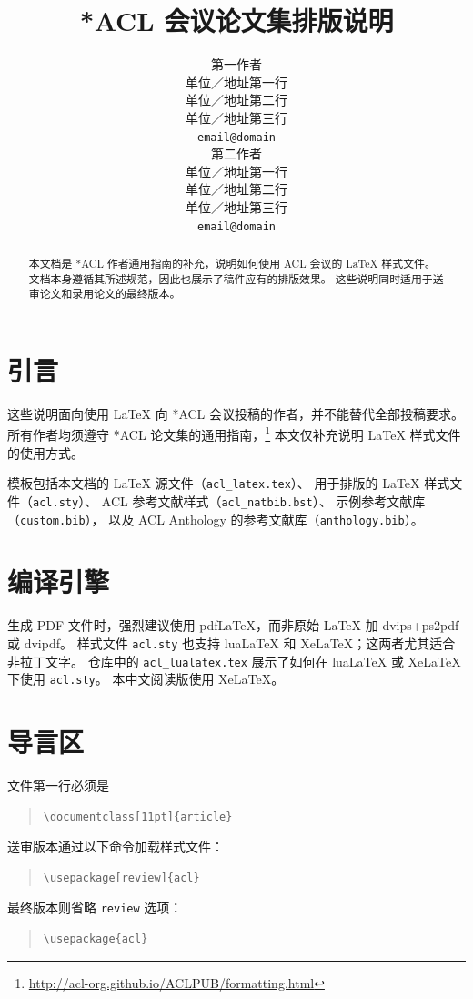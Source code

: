 \documentclass[11pt]{article}
\title{*ACL 会议论文集排版说明}
\author{第一作者 \\
  单位／地址第一行 \\
  单位／地址第二行 \\
  单位／地址第三行 \\
  \texttt{email@domain} \\\And
  第二作者 \\
  单位／地址第一行 \\
  单位／地址第二行 \\
  单位／地址第三行 \\
  \texttt{email@domain} \\}
\begin{document}
\maketitle
\begin{abstract}
本文档是 *ACL 作者通用指南的补充，说明如何使用 ACL 会议的 \LaTeX{} 样式文件。
文档本身遵循其所述规范，因此也展示了稿件应有的排版效果。
这些说明同时适用于送审论文和录用论文的最终版本。
\end{abstract}

\section{引言}

这些说明面向使用 \LaTeX{} 向 *ACL 会议投稿的作者，并不能替代全部投稿要求。所有作者均须遵守 *ACL 论文集的通用指南，\footnote{\url{http://acl-org.github.io/ACLPUB/formatting.html}} 本文仅补充说明 \LaTeX{} 样式文件的使用方式。

模板包括本文档的 \LaTeX{} 源文件（\texttt{acl\_latex.tex}）、
用于排版的 \LaTeX{} 样式文件（\texttt{acl.sty}）、
ACL 参考文献样式（\texttt{acl\_natbib.bst}）、
示例参考文献库（\texttt{custom.bib}），
以及 ACL Anthology 的参考文献库（\texttt{anthology.bib}）。

\section{编译引擎}

生成 PDF 文件时，强烈建议使用 pdf\LaTeX{}，而非原始 \LaTeX{} 加 dvips+ps2pdf 或 dvipdf。
样式文件 \texttt{acl.sty} 也支持 lua\LaTeX{} 和 Xe\LaTeX{}；这两者尤其适合非拉丁文字。
仓库中的 \texttt{acl\_lualatex.tex} 展示了如何在 lua\LaTeX{} 或 Xe\LaTeX{} 下使用 \texttt{acl.sty}。
本中文阅读版使用 Xe\LaTeX{}。

\section{导言区}

文件第一行必须是
\begin{quote}
\begin{verbatim}
\documentclass[11pt]{article}
\end{verbatim}
\end{quote}

送审版本通过以下命令加载样式文件：
\begin{quote}
\begin{verbatim}
\usepackage[review]{acl}
\end{verbatim}
\end{quote}
最终版本则省略 \verb|review| 选项：
\begin{quote}
\begin{verbatim}
\usepackage{acl}
\end{verbatim}
\end{quote}
\end{document}
